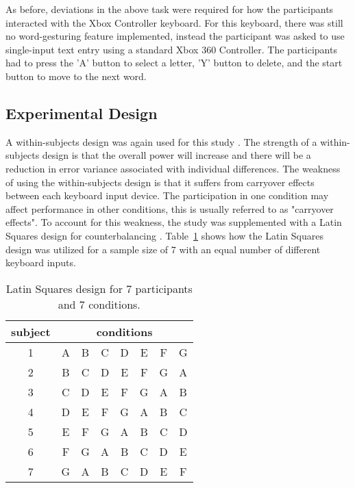 As before, deviations in the above task were required for how the participants interacted with the Xbox Controller keyboard. For this keyboard, there was still no word-gesturing feature implemented, instead the participant was asked to use single-input text entry using a standard Xbox 360 Controller. The participants had to press the 'A' button to select a letter, 'Y' button to delete, and the start button to move to the next word.

\subsection{Experimental Design} \label{pilot_experimental_design}
A within-subjects design was again used for this study \cite{ref_within_subjects}. The strength of a within-subjects design is that the overall power will increase and there will be a reduction in error variance associated with individual differences. The weakness of using the within-subjects design is that it suffers from carryover effects between each keyboard input device. The participation in one condition may affect performance in other conditions, this is usually referred to as "carryover effects". To account for this weakness, the study was supplemented with a Latin Squares design for counterbalancing \cite{ref_latin_squares}. Table~\ref{pilot_latin_squares} shows how the Latin Squares design was utilized for a sample size of 7 with an equal number of different keyboard inputs.

\begin{table}[h] %
	\centering
	\caption[Latin Squares Example]{\centering Latin Squares design for 7 participants and 7 conditions.}
	\label{pilot_latin_squares}
	\begin{tabular}{c | c c c c c c c}
		\hline
		subject & \multicolumn{7}{c}{conditions} \\
		\hline
		1 & A & B & C & D & E & F & G \\
		2 & B & C & D & E & F & G & A \\
		3 & C & D & E & F & G & A & B \\
		4 & D & E & F & G & A & B & C \\
		5 & E & F & G & A & B & C & D \\
		6 & F & G & A & B & C & D & E \\
		7 & G & A & B & C & D & E & F \\
		\hline
	\end{tabular}
\end{table}

